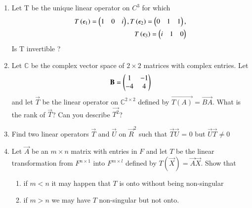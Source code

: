\renewcommand{\theequation}{\theenumi}
\renewcommand{\thefigure}{\theenumi}
\begin{enumerate}[label=\thesubsection.\arabic*.,ref=\thesubsection.\theenumi]

%
\item Let T be the unique linear operator on $C^{3}$ for which 
   \begin{multline}
    \begin{aligned}
    T\left(\epsilon_1\right)=\begin{pmatrix}1&0&i\end{pmatrix} , T\left(\epsilon_2\right)=\begin{pmatrix}0&1&1\end{pmatrix} ,\\ T\left(\epsilon_3\right)=\begin{pmatrix}i&1&0\end{pmatrix} 
    \end{aligned}
    \end{multline}
    Is T invertible ?
%
\\
\solution

\item Let $\mathbb{C}$ be the complex vector space of $2\times2$ matrices with complex entries. Let
\begin{align}
	\mathbf{B} = \begin{pmatrix}1 & -1 \\ -4 & 4\end{pmatrix}
\end{align}
and let $\vec{T}$ be the linear operator on $\mathbb{C}^{2\times2}$  defined by $\vec{T(A)} = \vec{BA}$. What is the rank of $\vec{T}$? Can you describe $\vec{T^2}$?   
%
\\
\solution

%
\item Find two linear operators $\vec{T}$ and $\vec{U}$ on $\vec{R}^2$ such that $\vec{T}\vec{U}$ = 0 but $\vec{U}\vec{T} \neq 0$
%
\\
\solution


%
\item Let $\vec{A}$ be an $m \times n$ matrix with entries in $F$ and let $T$ be the linear transformation from $F^{n \times1 }$ into $F^{m \times l}$ defined by $T(\vec{X}) = \vec{A}\vec{X}$. Show that 
\begin{enumerate}
\item
if $m < n$ it may happen that $T$ is onto without being non-singular
\item
if $m>n$ we may have $T$ non-singular but not onto.
\\
\end{enumerate}
%
\solution

\end{enumerate}
